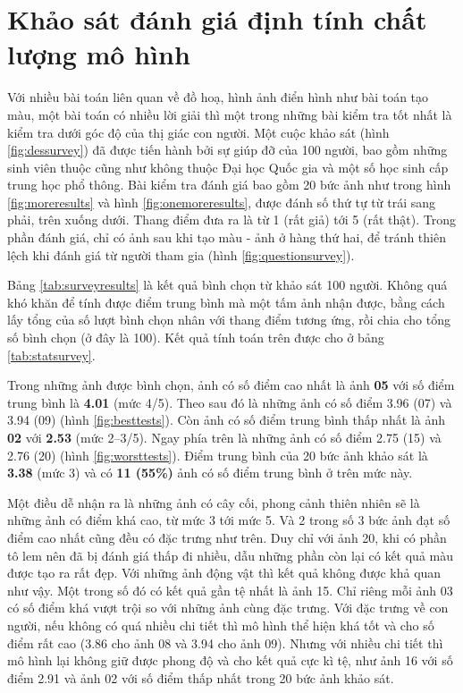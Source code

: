 \documentclass[a4paper, 12pt]{report}
\begin{document}
\section{Khảo sát đánh giá định tính chất lượng mô hình}\label{surveyforevaluation}

Với nhiều bài toán liên quan về đồ hoạ, hình ảnh điển hình như bài toán tạo màu, một bài toán có nhiều lời giải thì một trong những bài kiểm tra tốt nhất là kiểm tra dưới góc độ của thị giác con người.
Một cuộc khảo sát (hình \ref{fig:dessurvey}) đã được tiến hành bởi sự giúp đỡ của 100 người, bao gồm những sinh viên thuộc cũng như không thuộc Đại học Quốc gia và một số học sinh cấp trung học phổ thông.
Bài kiểm tra đánh giá bao gồm 20 bức ảnh như trong hình \ref{fig:moreresults} và hình \ref{fig:onemoreresults}, được đánh số thứ tự từ trái sang phải, trên xuống dưới.
Thang điểm đưa ra là từ 1 (rất giả) tới 5 (rất thật).
Trong phần đánh giá, chỉ có ảnh sau khi tạo màu - ảnh ở hàng thứ hai, để tránh thiên lệch khi đánh giá từ người tham gia (hình \ref{fig:questionsurvey}).\vspace{5pt}

Bảng \ref{tab:surveyresults} là kết quả bình chọn từ khảo sát 100 người.
Không quá khó khăn để tính được điểm trung bình mà một tấm ảnh nhận được, bằng cách lấy tổng của số lượt bình chọn nhân với thang điểm tương ứng, rồi chia cho tổng số bình chọn (ở đây là 100).
Kết quả tính toán trên được cho ở bảng \ref{tab:statsurvey}.\vspace{5pt}

Trong những ảnh được bình chọn, ảnh có số điểm cao nhất là ảnh \textbf{05} với số điểm trung bình là \textbf{4.01} (mức 4/5).
Theo sau đó là những ảnh có số điểm 3.96 (07) và 3.94 (09) (hình \ref{fig:besttests}).
Còn ảnh có số điểm trung bình thấp nhất là ảnh \textbf{02} với \textbf{2.53} (mức 2--3/5).
Ngay phía trên là những ảnh có số điểm 2.75 (15) và 2.76 (20) (hình \ref{fig:worsttests}).
Điểm trung bình của 20 bức ảnh khảo sát là \textbf{3.38} (mức 3) và có \textbf{11 (55\%)} ảnh có số điểm trung bình ở trên mức này.\vspace{5pt}

Một điều dễ nhận ra là những ảnh có cây cối, phong cảnh thiên nhiên sẽ là những ảnh có điểm khá cao, từ mức 3 tới mức 5.
Và 2 trong số 3 bức ảnh đạt số điểm cao nhất cũng đều có đặc trưng như trên.
Duy chỉ với ảnh 20, khi có phần tô lem nên đã bị đánh giá thấp đi nhiều, dẫu những phần còn lại có kết quả màu được tạo ra rất đẹp.
Với những ảnh động vật thì kết quả không được khả quan như vậy.
Một trong số đó có kết quả gần tệ nhất là ảnh 15.
Chỉ riêng mỗi ảnh 03 có số điểm khá vượt trội so với những ảnh cùng đặc trưng.
Với đặc trưng về con người, nếu không có quá nhiều chi tiết thì mô hình thể hiện khá tốt và cho số điểm rất cao (3.86 cho ảnh 08 và 3.94 cho ảnh 09).
Nhưng với nhiều chi tiết thì mô hình lại không giữ được phong độ và cho kết quả cực kì tệ, như ảnh 16 với số điểm 2.91 và ảnh 02 với số điểm thấp nhất trong 20 bức ảnh khảo sát.
\end{document}
